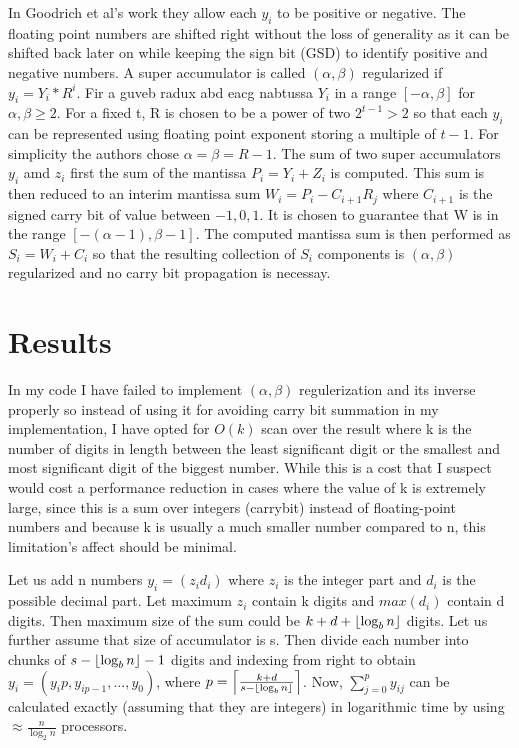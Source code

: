 \documentclass[11pt]{article}       %
\DeclarePairedDelimiter{\ceil}{\lceil}{\rceil}
\DeclarePairedDelimiter{\floor}{\lfloor}{\rfloor}
\begin{document}
In Goodrich et al's work they allow each $y_i$ to be positive or negative. The floating point numbers are shifted right without the loss of generality as it can be shifted back later on while keeping the sign bit (GSD) to identify positive and negative numbers. A super accumulator is called $(\alpha,\beta)$ regularized if $y_i = Y_i * R^i$. Fir a guveb radux abd eacg nabtussa $Y_i$ in a range $[-\alpha, \beta]$ for $\alpha, \beta \geq 2$. For a fixed t, R is chosen to be a power of two $2^{t-1} > 2$ so that each $y_i$ can be represented using floating point exponent storing a multiple of $t-1$. For simplicity the authors chose $\alpha = \beta = R-1$. The sum of two super accumulators $y_i$ amd $z_i$ first the sum of the mantissa $P_i = Y_i + Z_i$ is computed. This sum is then reduced to an interim mantissa sum $W_i = P_i - C_{i+1}R_j$ where $C_{i+1}$ is the signed carry bit of value between ${-1,0,1}$. It is chosen to guarantee that W is in the range $[-(\alpha-1), \beta-1]$. The computed mantissa sum is then performed as $S_i = W_i + C_i$ so that the resulting collection of $S_i$ components is $(\alpha,\beta)$ regularized and no carry bit propagation is necessay.

\section{Results} \label{results}

In my code I have failed to implement $(\alpha, \beta)$ regulerization and its inverse properly so instead of using it for avoiding carry bit summation in my implementation, I have opted for $O(k)$ scan over the result where k is the number of digits in length between the least significant digit or the smallest and most significant digit of the biggest number. While this is a cost that I suspect would cost a performance reduction in cases where the value of k is extremely large, since this is a sum over integers (carrybit) instead of floating-point numbers and because k is usually a much smaller number compared to n, this limitation's affect should be minimal.

Let us add n numbers $y_i = (z_i d_i)$ where $z_i$ is the integer part and $d_i$ is the possible decimal part. Let maximum ${z_i}$ contain k digits and $max(d_i)$ contain d digits. Then maximum size of the sum could be $k + d + \floor*{\log_b {n}}$ digits. Let us further assume that size of accumulator is s. Then divide each number into chunks of $s - \floor*{\log_b {n}} - 1$ digits and indexing from right to obtain $y_i =(y_ip, y_{ip-1},..., y_0)$, where $p=\ceil*{\frac{k+d}{s- \floor*{\log_b {n}}}}$. Now, $\sum\limits_{j=0}^{p}y_{ij}$ can be calculated exactly (assuming that they are integers) in logarithmic time by using $\approx \frac{n}{\log_2 {n}}$ processors.  
\end{document}
